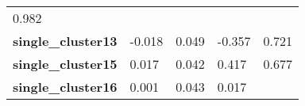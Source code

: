 \documentclass[]{article}
\begin{document}
\begin{longtable}[c]{@{}lllll@{}}
\begin{minipage}[t]{0.12\columnwidth}\raggedright\strut
0.982
\strut\end{minipage}\tabularnewline
\begin{minipage}[t]{0.31\columnwidth}\raggedright\strut
\textbf{single\_cluster13}
\strut\end{minipage} &
\begin{minipage}[t]{0.13\columnwidth}\raggedright\strut
-0.018
\strut\end{minipage} &
\begin{minipage}[t]{0.16\columnwidth}\raggedright\strut
0.049
\strut\end{minipage} &
\begin{minipage}[t]{0.12\columnwidth}\raggedright\strut
-0.357
\strut\end{minipage} &
\begin{minipage}[t]{0.12\columnwidth}\raggedright\strut
0.721
\strut\end{minipage}\tabularnewline
\begin{minipage}[t]{0.31\columnwidth}\raggedright\strut
\textbf{single\_cluster15}
\strut\end{minipage} &
\begin{minipage}[t]{0.13\columnwidth}\raggedright\strut
0.017
\strut\end{minipage} &
\begin{minipage}[t]{0.16\columnwidth}\raggedright\strut
0.042
\strut\end{minipage} &
\begin{minipage}[t]{0.12\columnwidth}\raggedright\strut
0.417
\strut\end{minipage} &
\begin{minipage}[t]{0.12\columnwidth}\raggedright\strut
0.677
\strut\end{minipage}\tabularnewline
\begin{minipage}[t]{0.31\columnwidth}\raggedright\strut
\textbf{single\_cluster16}
\strut\end{minipage} &
\begin{minipage}[t]{0.13\columnwidth}\raggedright\strut
0.001
\strut\end{minipage} &
\begin{minipage}[t]{0.16\columnwidth}\raggedright\strut
0.043
\strut\end{minipage} &
\begin{minipage}[t]{0.12\columnwidth}\raggedright\strut
0.017
\strut\end{minipage} &
\begin{minipage}[t]{0.12\columnwidth}\raggedright\strut

\end{minipage}
\end{longtable}
\end{document}
